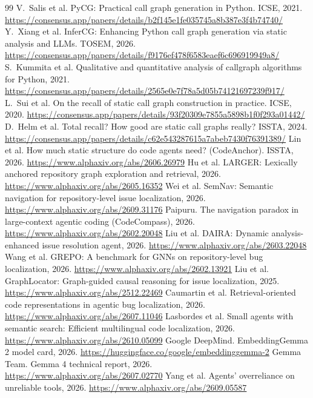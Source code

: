 \documentclass[10pt,a4paper]{article}
\begin{document}
\begin{thebibliography}{99}\small
{} V.~Salis et al. PyCG: Practical call graph generation in Python. ICSE, 2021. \url{https://consensus.app/papers/details/b2f145e1fe035745a8b387e3f4b74740/}
 Y.~Xiang et al. InferCG: Enhancing Python call graph generation via static analysis and LLMs. TOSEM, 2026. \url{https://consensus.app/papers/details/f9176ef478f6583eaef6c696919949a8/}
 S.~Kummita et al. Qualitative and quantitative analysis of callgraph algorithms for Python, 2021. \url{https://consensus.app/papers/details/2565e0e7f78a5d05b74121697239f917/}
 L.~Sui et al. On the recall of static call graph construction in practice. ICSE, 2020. \url{https://consensus.app/papers/details/93f20309e7855a5898b1f0f293a01442/}
 D.~Helm et al. Total recall? How good are static call graphs really? ISSTA, 2024. \url{https://consensus.app/papers/details/c62e543287615a7abeb7430f76391389/}
 Lin et al. How much static structure do code agents need? (CodeAnchor). ISSTA, 2026. \url{https://www.alphaxiv.org/abs/2606.26979}
 Hu et al. LARGER: Lexically anchored repository graph exploration and retrieval, 2026. \url{https://www.alphaxiv.org/abs/2605.16352}
 Wei et al. SemNav: Semantic navigation for repository-level issue localization, 2026. \url{https://www.alphaxiv.org/abs/2609.31176}
 Paipuru. The navigation paradox in large-context agentic coding (CodeCompass), 2026. \url{https://www.alphaxiv.org/abs/2602.20048}
 Liu et al. DAIRA: Dynamic analysis-enhanced issue resolution agent, 2026. \url{https://www.alphaxiv.org/abs/2603.22048}
 Wang et al. GREPO: A benchmark for GNNs on repository-level bug localization, 2026. \url{https://www.alphaxiv.org/abs/2602.13921}
 Liu et al. GraphLocator: Graph-guided causal reasoning for issue localization, 2025. \url{https://www.alphaxiv.org/abs/2512.22469}
 Caumartin et al. Retrieval-oriented code representations in agentic bug localization, 2026. \url{https://www.alphaxiv.org/abs/2607.11046}
 Lasbordes et al. Small agents with semantic search: Efficient multilingual code localization, 2026. \url{https://www.alphaxiv.org/abs/2610.05099}
 Google DeepMind. EmbeddingGemma 2 model card, 2026. \url{https://huggingface.co/google/embeddinggemma-2}
 Gemma Team. Gemma 4 technical report, 2026. \url{https://www.alphaxiv.org/abs/2607.02770}
 Yang et al. Agents' overreliance on unreliable tools, 2026. \url{https://www.alphaxiv.org/abs/2609.05587}
\end{thebibliography}
\end{document}
